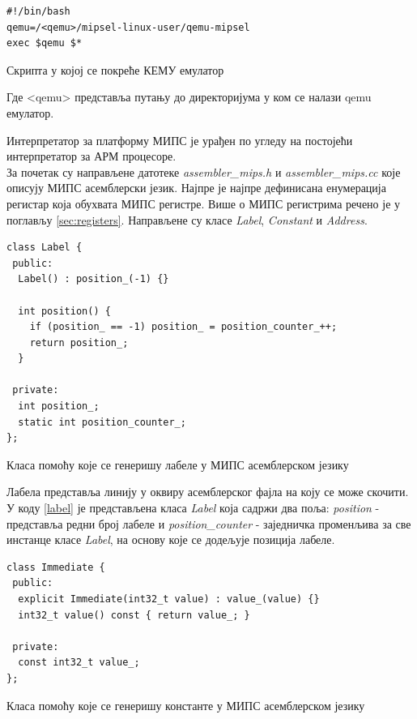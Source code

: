 \documentclass[12pt,oneside]{memoir}
\begin{document}
\begin{listing}
\centering
\begin{verbatim}
#!/bin/bash
qemu=/<qemu>/mipsel-linux-user/qemu-mipsel
exec $qemu $*
\end{verbatim}
\caption{Скрипта у којој се покреће КЕМУ емулатор}
\label{skripta}
\end{listing}
Где <qemu> представља путању до директоријума у ком се налази qemu емулатор.

Интерпретатор за платформу МИПС је урађен по угледу на постојећи интерпретатор за АРМ процесоре.\\
За почетак су направљене датотеке \textit{assembler\_mips.h} и \textit{assembler\_mips.cc} које описују МИПС асемблерски језик. Најпре је најпре дефинисана енумерација регистар која обухвата МИПС регистре. Више о МИПС регистрима речено је у поглављу \ref{sec:registers}. Направљене су класе \textit{Label}, \textit{Constant} и \textit{Address}. 

\begin{listing}
\begin{verbatim}
class Label {
 public:
  Label() : position_(-1) {}

  int position() {
    if (position_ == -1) position_ = position_counter_++;
    return position_;
  }

 private:
  int position_;
  static int position_counter_;
}; 
\end{verbatim}
\caption{Класа помоћу које се генеришу лабеле у МИПС асемблерском језику}
\label{label}
\end{listing}

Лабела представља линију у оквиру асемблерског фајла на коју се може скочити. У коду \ref{label} је представљена класа \textit{Label} која садржи два поља: \textit{position} - представља редни број лабеле и \textit{position\_counter} - заједничка променљива за све инстанце класе \textit{Label}, на основу које се додељује позиција лабеле.\\

\begin{listing}
\begin{verbatim}
class Immediate {
 public:
  explicit Immediate(int32_t value) : value_(value) {}
  int32_t value() const { return value_; }

 private:
  const int32_t value_;
};
\end{verbatim}
\caption{Класа помоћу које се генеришу константе у МИПС асемблерском језику}
\label{konstanta}
\end{listing}
\end{document}
